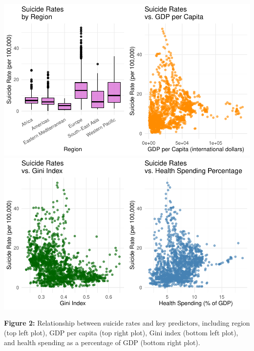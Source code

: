 \documentclass[
]{article}
\begin{document}
\includegraphics{final_report_files/figure-latex/suicide-against-vars-1.pdf}
\includegraphics{final_report_files/figure-latex/suicide-against-vars-2.pdf}

\textbf{Figure 2:} Relationship between suicide rates and key
predictors, including region (top left plot), GDP per capita (top right
plot), Gini index (bottom left plot), and health spending as a
percentage of GDP (bottom right plot).

\newpage
\end{document}
